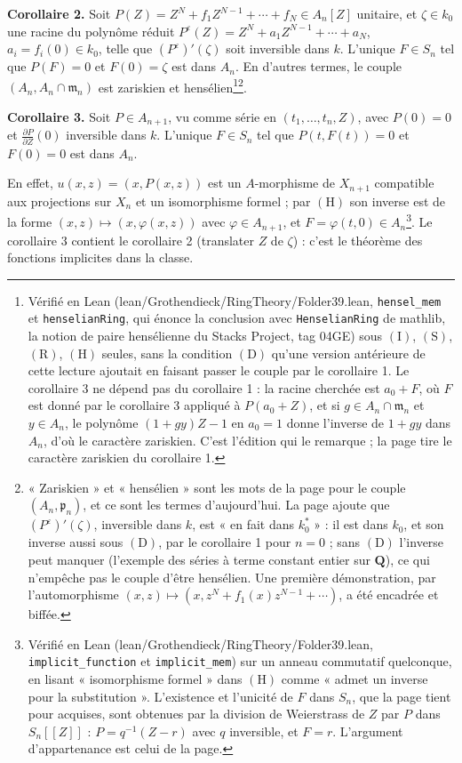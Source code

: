 \documentclass[11pt,a4paper]{article}
\begin{document}
\textbf{Corollaire 2.} Soit $P(Z) = Z^N + f_1 Z^{N-1} + \cdots + f_N \in A_n[Z]$
unitaire, et $\zeta \in k_0$ une racine du polynôme réduit
$P^\varepsilon(Z) = Z^N + a_1 Z^{N-1} + \cdots + a_N$, $a_i = f_i(0) \in k_0$, telle
que $(P^\varepsilon)'(\zeta)$ soit inversible dans $k$. L'unique $F \in S_n$ tel que
$P(F) = 0$ et $F(0) = \zeta$ est dans $A_n$. En d'autres termes, le couple
$(A_n, A_n \cap \mathfrak{m}_n)$ est zariskien et
hensélien\footnote{Vérifié en Lean (lean/Grothendieck/RingTheory/Folder39.lean,
\texttt{hensel\_mem} et \texttt{henselianRing}, qui énonce la conclusion avec
\texttt{HenselianRing} de mathlib, la notion de paire hensélienne du Stacks
Project, tag 04GE) sous $(\mathrm{I})$, $(\mathrm{S})$, $(\mathrm{R})$,
$(\mathrm{H})$ seules, sans la condition $(\mathrm{D})$ qu'une version
antérieure de cette lecture ajoutait en faisant passer le couple par le
corollaire 1. Le corollaire 3 ne dépend pas du corollaire 1 : la racine
cherchée est $a_0 + F$, où $F$ est donné par le corollaire 3 appliqué à
$P(a_0 + Z)$, et si $g \in A_n \cap \mathfrak{m}_n$ et $y \in A_n$, le
polynôme $(1 + gy)Z - 1$ en $a_0 = 1$ donne l'inverse de $1 + gy$ dans $A_n$,
d'où le caractère zariskien. C'est l'édition qui le remarque ; la page tire le
caractère zariskien du corollaire 1.}\footnote{« Zariskien » et « hensélien » sont les mots de la page pour
le couple $(A_n, \mathfrak{p}_n)$, et ce sont les termes d'aujourd'hui. La page
ajoute que $(P^\varepsilon)'(\zeta)$, inversible dans $k$, est « en fait dans
$k_0^*$ » : il est dans $k_0$, et son inverse aussi sous $(\mathrm{D})$, par
le corollaire 1 pour $n = 0$ ; sans $(\mathrm{D})$ l'inverse peut manquer
(l'exemple des séries à terme constant entier sur $\mathbf{Q}$), ce qui
n'empêche pas le couple d'être hensélien. Une première démonstration, par
l'automorphisme $(x, z) \mapsto (x, z^{N} + f_1(x) z^{N-1} + \cdots)$, a été
encadrée et biffée.}.

\textbf{Corollaire 3.} Soit $P \in A_{n+1}$, vu comme série en
$(t_1, \ldots, t_n, Z)$, avec $P(0) = 0$ et $\frac{\partial P}{\partial Z}(0)$
inversible dans $k$. L'unique $F \in S_n$ tel que $P(t, F(t)) = 0$ et
$F(0) = 0$ est dans $A_n$.

En effet, $u(x, z) = (x, P(x, z))$ est un $A$-morphisme de $X_{n+1}$ compatible
aux projections sur $X_n$ et un isomorphisme formel ; par $(\mathrm{H})$ son
inverse est de la forme $(x, z) \mapsto (x, \varphi(x, z))$ avec
$\varphi \in A_{n+1}$, et $F = \varphi(t, 0) \in A_n$\footnote{Vérifié en
Lean (lean/Grothendieck/RingTheory/Folder39.lean, \texttt{implicit\_function} et
\texttt{implicit\_mem}) sur un anneau commutatif quelconque, en lisant
« isomorphisme formel » dans $(\mathrm{H})$ comme « admet un inverse pour la
substitution ». L'existence et l'unicité de $F$ dans $S_n$, que la page tient
pour acquises, sont obtenues par la division de Weierstrass de $Z$ par $P$
dans $S_n[[Z]]$ : $P = q^{-1}(Z - r)$ avec $q$ inversible, et $F = r$.
L'argument d'appartenance est celui de la page.}. Le corollaire 3 contient le
corollaire 2 (translater $Z$ de $\zeta$) : c'est le théorème des fonctions
implicites dans la classe.
\end{document}
